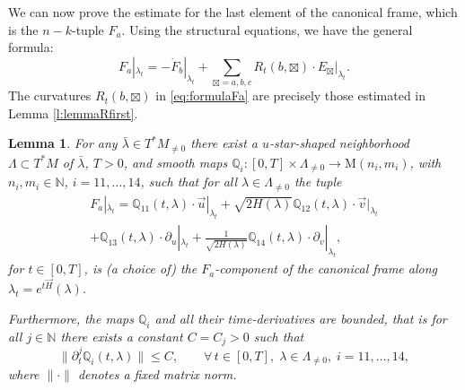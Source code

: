 \documentclass[11pt,a4paper]{article}
\theoremstyle{plain}
\newtheorem{lemma}[theorem]{Lemma}
\theoremstyle{definition}
\theoremstyle{remark}
\numberwithin{equation}{section}
\newcommand{\N}{\mathbb{N}} %
\newcommand{\Q}{\mathbb{Q}}
\begin{document}
We can now prove the estimate for the last element of the canonical frame, which is the $n-k$-tuple $F_a$. Using the structural equations, we have the general formula:
\begin{equation}\label{eq:formulaFa}
F_a|_{\lambda_t} = -\dot{F}_b|_{\lambda_t} + \sum_{\boxtimes =a,b,c} R_t(b,\boxtimes)\cdot E_{\boxtimes}|_{\lambda_t}.
\end{equation}
The curvatures $R_t(b,\boxtimes)$ in \eqref{eq:formulaFa} are precisely those estimated in Lemma \ref{l:lemmaRfirst}.


\begin{lemma}\label{l:lemmaFa}
For any $\bar{\lambda} \in T^*M_{\neq 0}$ there exist a $u$-star-shaped neighborhood $\Lambda \subset T^*M$ of $\bar{\lambda}$, $T>0$, and smooth maps $\Q_i: [0,T]\times  \Lambda_{\neq 0} \to \mathrm{M}(n_i,m_i)$, with $n_i,m_i\in \N$, $i=11,\dots,14$, such that for all $\lambda \in \Lambda_{\neq 0}$ the tuple
\begin{multline}
F_a|_{\lambda_t}  = \Q_{11}(t,\lambda)\cdot \vec{u}|_{\lambda_t} + \sqrt{2H(\lambda)} \Q_{12}(t,\lambda)\cdot \vec{v}|_{\lambda_t} \\
+  \Q_{13}(t,\lambda) \cdot \partial_u|_{\lambda_t} + \frac{1}{\sqrt{2H(\lambda)}}\Q_{14}(t,\lambda)\cdot \partial_v|_{\lambda_t},
\end{multline}
for $t\in [0,T]$, is (a choice of) the $F_a$-component of the canonical frame along $\lambda_t = e^{t\vec{H}}(\lambda)$.

Furthermore, the maps $\Q_i$ and all their time-derivatives are bounded, that is for all $j\in \N$ there exists a constant $C = C_j>0$ such that
\begin{equation}
\|\partial_t^{j}\Q_i(t,\lambda)\| \leq C ,\qquad \forall\, t \in [0,T],\; \lambda \in \Lambda_{\neq 0},\; i=11,\dots,14,
\end{equation}
where $\|\cdot\|$ denotes a fixed matrix norm.
\end{lemma}
\end{document}
